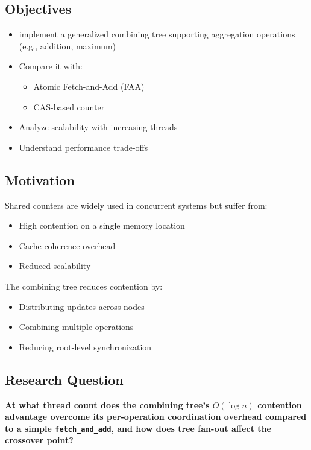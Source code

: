 \documentclass[11pt,a4paper]{article}
\begin{document}
\subsection{Objectives}
\begin{itemize}
    \item implement a generalized combining tree supporting aggregation operations (e.g., addition, maximum)
    \item Compare it with:
    \begin{itemize}
        \item Atomic Fetch-and-Add (FAA)
        \item CAS-based counter
    \end{itemize}
    \item Analyze scalability with increasing threads
    \item Understand performance trade-offs
\end{itemize}

\subsection{Motivation}
Shared counters are widely used in concurrent systems but suffer from:
\begin{itemize}
    \item High contention on a single memory location
    \item Cache coherence overhead
    \item Reduced scalability
\end{itemize}
The combining tree reduces contention by:
\begin{itemize}
    \item Distributing updates across nodes
    \item Combining multiple operations
    \item Reducing root-level synchronization
\end{itemize}

\subsection{Research Question}

\textbf{At what thread count does the combining tree's $O(\log n)$ contention advantage overcome its per-operation coordination overhead compared to a simple \texttt{fetch\_and\_add}, and how does tree fan-out affect the crossover point?}

\end{document}
